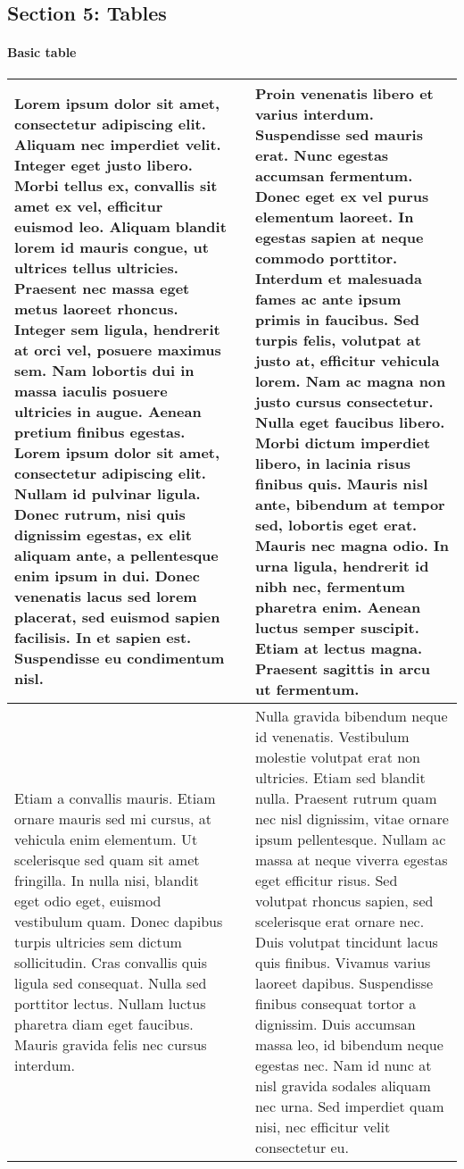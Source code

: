 \documentclass{article}
\begin{document}
\subsection*{Section 5: Tables}\paragraph{Basic table}\begin{tabularx}{\textwidth}{X|X}
\hline

Lorem ipsum dolor sit amet, consectetur adipiscing elit. Aliquam nec imperdiet velit. Integer eget justo libero. Morbi tellus ex, convallis sit amet ex vel, efficitur euismod leo. Aliquam blandit lorem id mauris congue, ut ultrices tellus ultricies. Praesent nec massa eget metus laoreet rhoncus. Integer sem ligula, hendrerit at orci vel, posuere maximus sem. Nam lobortis dui in massa iaculis posuere ultricies in augue. Aenean pretium finibus egestas. Lorem ipsum dolor sit amet, consectetur adipiscing elit. Nullam id pulvinar ligula. Donec rutrum, nisi quis dignissim egestas, ex elit aliquam ante, a pellentesque enim ipsum in dui. Donec venenatis lacus sed lorem placerat, sed euismod sapien facilisis. In et sapien est. Suspendisse eu condimentum nisl.
 & & 
Proin venenatis libero et varius interdum. Suspendisse sed mauris erat. Nunc egestas accumsan fermentum. Donec eget ex vel purus elementum laoreet. In egestas sapien at neque commodo porttitor. Interdum et malesuada fames ac ante ipsum primis in faucibus. Sed turpis felis, volutpat at justo at, efficitur vehicula lorem. Nam ac magna non justo cursus consectetur. Nulla eget faucibus libero. Morbi dictum imperdiet libero, in lacinia risus finibus quis. Mauris nisl ante, bibendum at tempor sed, lobortis eget erat. Mauris nec magna odio. In urna ligula, hendrerit id nibh nec, fermentum pharetra enim. Aenean luctus semper suscipit. Etiam at lectus magna. Praesent sagittis in arcu ut fermentum.
 & \\ \hline

Etiam a convallis mauris. Etiam ornare mauris sed mi cursus, at vehicula enim elementum. Ut scelerisque sed quam sit amet fringilla. In nulla nisi, blandit eget odio eget, euismod vestibulum quam. Donec dapibus turpis ultricies sem dictum sollicitudin. Cras convallis quis ligula sed consequat. Nulla sed porttitor lectus. Nullam luctus pharetra diam eget faucibus. Mauris gravida felis nec cursus interdum.
 & & 
Nulla gravida bibendum neque id venenatis. Vestibulum molestie volutpat erat non ultricies. Etiam sed blandit nulla. Praesent rutrum quam nec nisl dignissim, vitae ornare ipsum pellentesque. Nullam ac massa at neque viverra egestas eget efficitur risus. Sed volutpat rhoncus sapien, sed scelerisque erat ornare nec. Duis volutpat tincidunt lacus quis finibus. Vivamus varius laoreet dapibus. Suspendisse finibus consequat tortor a dignissim. Duis accumsan massa leo, id bibendum neque egestas nec. Nam id nunc at nisl gravida sodales aliquam nec urna. Sed imperdiet quam nisi, nec efficitur velit consectetur eu.
 & \\ \hline
\end{tabularx}
\end{document}
